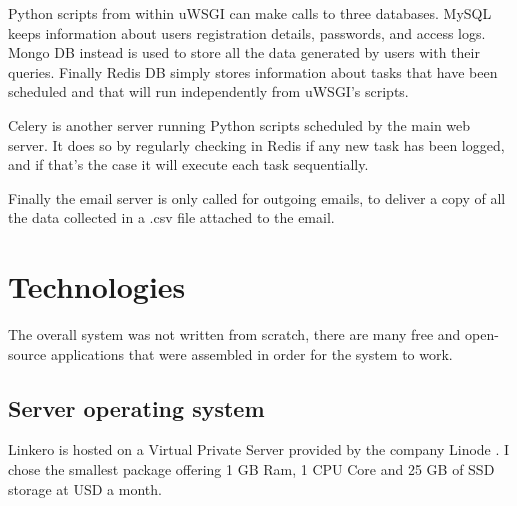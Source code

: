 Python scripts from within uWSGI can make calls to three databases. MySQL keeps
information about users registration details, passwords, and access logs. Mongo
DB instead is used to store all the data generated by users with their queries.
Finally Redis DB simply stores information about tasks that have been scheduled
and that will run independently from uWSGI's scripts.

Celery is another server running Python scripts scheduled by the main web
server. It does so by regularly checking in Redis if any new task has been
logged, and if that's the case it will execute each task sequentially.

Finally the email server is only called for outgoing emails, to deliver a copy
of all the data collected in a .csv file attached to the email.

\section{Technologies}

The overall system was not written from scratch, there are many free and
open-source applications that were assembled in order for the system to work.

\subsection{Server operating system}
Linkero is hosted on a Virtual Private Server provided by the company Linode
\texttrademark. I chose the smallest package offering 1 GB Ram, 1 CPU Core and
25 GB of SSD storage at  USD a month.

